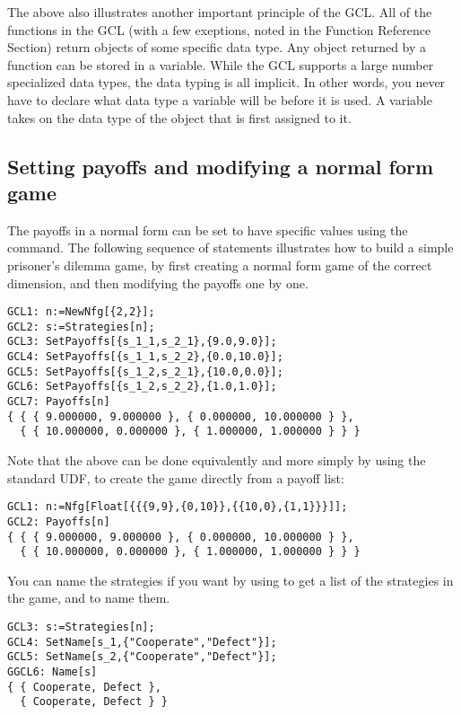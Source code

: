The above also illustrates another important principle of the GCL.
All of the functions in the GCL (with a few exeptions, noted in the
Function Reference Section) return objects of some specific data type.
Any object returned by a function can be stored in a variable.  While
the GCL supports a large number specialized data types, the data
typing is all implicit.  In other words, you never have to declare
what data type a variable will be before it is used.  A variable takes
on the data type of the object that is first assigned to it.    

\subsection{Setting payoffs and modifying a normal form
game}  

The payoffs in a normal form can be set to have specific values using
the  command.  The following sequence of statements
illustrates how to build a simple prisoner's dilemma game, by first
creating a normal form game of the correct dimension, and then
modifying the payoffs one by one.  

\begin{verbatim}
GCL1: n:=NewNfg[{2,2}];
GCL2: s:=Strategies[n];
GCL3: SetPayoffs[{s_1_1,s_2_1},{9.0,9.0}];
GCL4: SetPayoffs[{s_1_1,s_2_2},{0.0,10.0}];
GCL5: SetPayoffs[{s_1_2,s_2_1},{10.0,0.0}];
GCL6: SetPayoffs[{s_1_2,s_2_2},{1.0,1.0}];
GCL7: Payoffs[n]
{ { { 9.000000, 9.000000 }, { 0.000000, 10.000000 } },
  { { 10.000000, 0.000000 }, { 1.000000, 1.000000 } } }
\end{verbatim}

Note that the above can be done equivalently and more simply by using
the standard UDF,  to create the game directly from a payoff
list:

\begin{verbatim}
GCL1: n:=Nfg[Float[{{{9,9},{0,10}},{{10,0},{1,1}}}]];
GCL2: Payoffs[n]
{ { { 9.000000, 9.000000 }, { 0.000000, 10.000000 } },
  { { 10.000000, 0.000000 }, { 1.000000, 1.000000 } } }
\end{verbatim}

\noindent
You can name the strategies if you want by using  to
get a list of the strategies in the game, and  to name
them.

\begin{verbatim}
GCL3: s:=Strategies[n];
GCL4: SetName[s_1,{"Cooperate","Defect"}];
GCL5: SetName[s_2,{"Cooperate","Defect"}];  
GGCL6: Name[s]
{ { Cooperate, Defect },
  { Cooperate, Defect } }
\end{verbatim}

